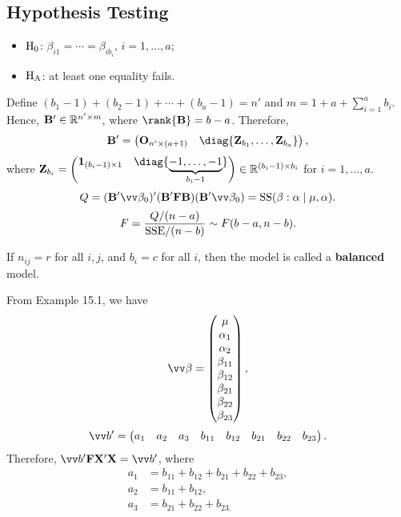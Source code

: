 \subsection*{Hypothesis Testing}
\begin{itemize}
    \item $ \text{H}_0 $: $ \beta_{i1}=\cdots=\beta_{ib_i} $, $ i=1,\ldots,a $;
    \item $ \text{H}_{\text{A}} $: at least one equality fails.
\end{itemize}
Define $ (b_1-1)+(b_2-1)+\cdots+(b_a-1)=n' $ and
$ m=1+a+\sum_{i=1}^{a}b_i $. Hence, $ \mathbf{B}'\in\mathbb{R}^{n'\times m} $, where $ \rank{\Matrix{B}}=b-a $. Therefore,
\[ \Matrix{B}'=\begin{pmatrix}
        \Matrix{O}_{n'\times (a+1)} & \diag{\Matrix{Z}_{b_1},\ldots,\Matrix{Z}_{b_a}}
    \end{pmatrix}, \]
where $ \Matrix{Z}_{b_i}=\begin{pmatrix}
        \Matrix{1}_{(b_i-1)\times 1} & \diag{\underbrace{-1,\ldots,-1}_{b_i-1}}
    \end{pmatrix}\in\R^{(b_i-1)\times b_i} $ for $ i=1,\ldots,a $.
\[ Q=(\Matrix{B}'\Vector{\beta}_0)'(\Matrix{B}'\Matrix{F}\Matrix{B})(\Matrix{B}'\Vector{\beta}_0)=\text{SS}(\beta:\alpha\mid \mu,\alpha).  \]
\[ F=\frac{Q/(n-a)}{\text{SSE}/(n-b)} \sim F(b-a,n-b). \]
\begin{Remark}{}{}
    If $ n_{ij}=r $ for all $ i,j $, and $ b_i=c $ for all $ i $, then the model
    is called a \textbf{balanced} model.
\end{Remark}
From Example 15.1, we have
\[ \Vector{\beta}=\begin{pmatrix}
        \mu        \\
        \alpha_1   \\
        \alpha_2   \\
        \beta_{11} \\
        \beta_{12} \\
        \beta_{21} \\
        \beta_{22} \\
        \beta_{23}
    \end{pmatrix}, \]
\[ \Vector{b}'=\begin{pmatrix}
        a_1 & a_2 & a_3 & b_{11} & b_{12} & b_{21} & b_{22} & b_{23}
    \end{pmatrix}. \]
Therefore, $ \Vector{b}'\Matrix{F}\Matrix{X}'\Matrix{X}=\Vector{b}' $, where
\begin{align*}
    a_1 & = b_{11} + b_{12} + b_{21} + b_{22} + b_{23}, \\
    a_2 & =b_{11} +b_{12},                              \\
    a_3 & =b_{21}+b_{22}+b_{23.}
\end{align*}
